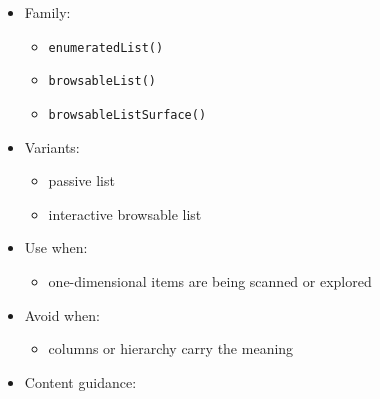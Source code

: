 \begin{itemize}
\tightlist
\item
  Family:

  \begin{itemize}
  \tightlist
  \item
    \texttt{e\allowbreak{}n\allowbreak{}u\allowbreak{}m\allowbreak{}e\allowbreak{}r\allowbreak{}a\allowbreak{}t\allowbreak{}e\allowbreak{}d\allowbreak{}L\allowbreak{}i\allowbreak{}s\allowbreak{}t\allowbreak{}(\allowbreak{})}
  \item
    \texttt{b\allowbreak{}r\allowbreak{}o\allowbreak{}w\allowbreak{}s\allowbreak{}a\allowbreak{}b\allowbreak{}l\allowbreak{}e\allowbreak{}L\allowbreak{}i\allowbreak{}s\allowbreak{}t\allowbreak{}(\allowbreak{})}
  \item
    \texttt{b\allowbreak{}r\allowbreak{}o\allowbreak{}w\allowbreak{}s\allowbreak{}a\allowbreak{}b\allowbreak{}l\allowbreak{}e\allowbreak{}L\allowbreak{}i\allowbreak{}s\allowbreak{}t\allowbreak{}S\allowbreak{}u\allowbreak{}r\allowbreak{}f\allowbreak{}a\allowbreak{}c\allowbreak{}e\allowbreak{}(\allowbreak{})}
  \end{itemize}
\item
  Variants:

  \begin{itemize}
  \tightlist
  \item
    passive list
  \item
    interactive browsable list
  \end{itemize}
\item
  Use when:

  \begin{itemize}
  \tightlist
  \item
    one-dimensional items are being scanned or explored
  \end{itemize}
\item
  Avoid when:

  \begin{itemize}
  \tightlist
  \item
    columns or hierarchy carry the meaning
  \end{itemize}
\item
  Content guidance:


\end{itemize}
